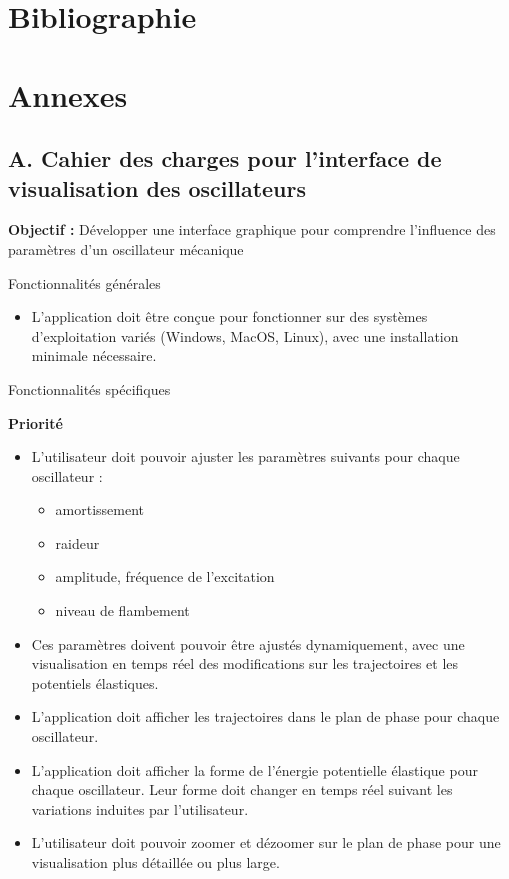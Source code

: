 \documentclass[a4paper, french, 12pt, titlepage]{article}
\begin{document}
\newpage

\section{Bibliographie}




\newpage

\listoffigures

\newpage

\section{Annexes}

\subsection*{A. Cahier des charges pour l'interface de visualisation des oscillateurs}


\textbf{Objectif :} Développer une interface graphique pour comprendre l'influence des paramètres d'un oscillateur mécanique

\large{Fonctionnalités générales}
\begin{itemize}
  \item L'application doit être conçue pour fonctionner sur des systèmes d'exploitation variés (Windows, MacOS, Linux), avec une installation minimale nécessaire.
\end{itemize}


\large{Fonctionnalités spécifiques}

\textbf{Priorité}
\begin{itemize}
  \item L'utilisateur doit pouvoir ajuster les paramètres suivants pour chaque oscillateur :
        \begin{itemize}
          \item amortissement
          \item raideur
          \item amplitude, fréquence de l'excitation
          \item niveau de flambement
        \end{itemize}
  \item Ces paramètres doivent pouvoir être ajustés dynamiquement, avec une visualisation en temps réel des modifications sur les trajectoires et les potentiels élastiques.
  \item L'application doit afficher les trajectoires dans le plan de phase pour chaque oscillateur.
  \item L'application doit afficher la forme de l'énergie potentielle élastique pour chaque oscillateur. Leur forme doit changer en temps réel suivant les variations induites par l'utilisateur.
  \item L'utilisateur doit pouvoir zoomer et dézoomer sur le plan de phase pour une visualisation plus détaillée ou plus large.
\end{itemize}
\end{document}
